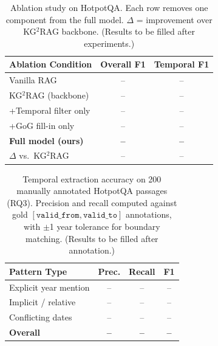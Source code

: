 \documentclass[11pt]{article}
\begin{document}
\begin{table}[t]
  \centering
  \small
  \begin{tabular}{lcc}
    \toprule
    \textbf{Ablation Condition} &
    \textbf{Overall F1} &
    \textbf{Temporal F1} \\
    \midrule
    Vanilla RAG                    & -- & -- \\
    KG$^2$RAG (backbone)           & -- & -- \\
    \quad +Temporal filter only    & -- & -- \\
    \quad +GoG fill-in only        & -- & -- \\
    \quad \textbf{Full model (ours)} & \textbf{--} & \textbf{--} \\
    \midrule
    $\Delta$ vs.\ KG$^2$RAG       & --  & -- \\
    \bottomrule
  \end{tabular}
  \caption{Ablation study on HotpotQA. Each row removes one component
  from the full model. $\Delta$ = improvement over KG$^2$RAG backbone.
  (Results to be filled after experiments.)}
  \label{tab:ablation_scores}
\end{table}

\begin{table}[t]
  \centering
  \small
  \begin{tabular}{lccc}
    \toprule
    \textbf{Pattern Type} & \textbf{Prec.} & \textbf{Recall} & \textbf{F1} \\
    \midrule
    Explicit year mention   & -- & -- & -- \\
    Implicit / relative     & -- & -- & -- \\
    Conflicting dates       & -- & -- & -- \\
    \midrule
    \textbf{Overall}        & \textbf{--} & \textbf{--} & \textbf{--} \\
    \bottomrule
  \end{tabular}
  \caption{Temporal extraction accuracy on 200 manually annotated
  HotpotQA passages (RQ3). Precision and recall computed against
  gold $[\mathtt{valid\_from}, \mathtt{valid\_to}]$ annotations,
  with $\pm$1 year tolerance for boundary matching.
  (Results to be filled after annotation.)}
  \label{tab:extraction}
\end{table}
\end{document}
